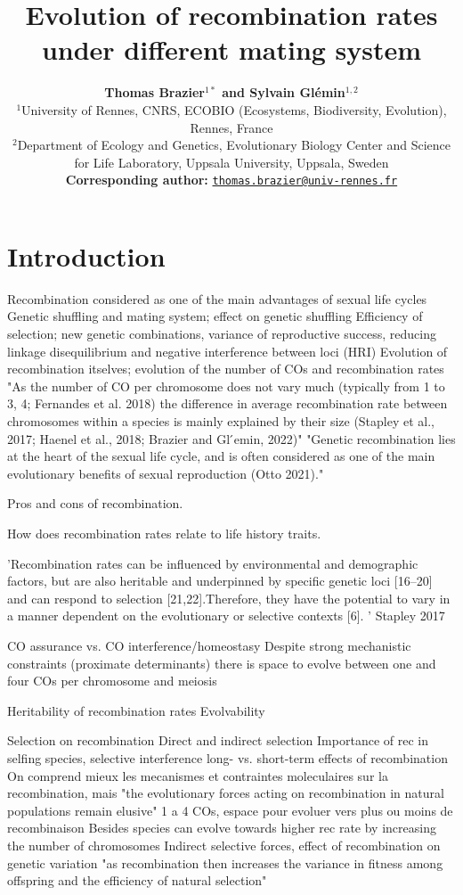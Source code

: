 \documentclass{article}
\title{Evolution of recombination rates under different mating system}
\author{
    \large
    \textbf{Thomas {Brazier}$^{1*}$\orcidlink{0000-0001-5990-7545} and Sylvain {Glémin}$^{1,2}$\orcidlink{0000-0001-7260-4573}}\\
    \normalsize
    $^{1}$University of Rennes, CNRS, ECOBIO (Ecosystems, Biodiversity, Evolution), Rennes, France\\
    $^{2}$Department of Ecology and Genetics, Evolutionary Biology Center and Science for Life Laboratory, Uppsala University, Uppsala, Sweden \\
    \textbf{Corresponding author:} \texttt{\href{mailto:thomas.brazier@univ-rennes.fr}{thomas.brazier@univ-rennes.fr}} \\
}
\begin{document}
\maketitle

\begin{abstract}
\end{abstract}


\newpage


\section*{Introduction}

Recombination considered as one of the main advantages of sexual life cycles
Genetic shuffling and mating system; effect on genetic shuffling
Efficiency of selection; new genetic combinations, variance of reproductive success, reducing linkage disequilibrium and
negative interference between loci (HRI)
Evolution of recombination itselves; evolution of the number of COs and recombination rates
"As the number of CO per chromosome does not vary much (typically from 1 to 3, 4; Fernandes et al. 2018) the difference in average recombination rate between chromosomes within a species is mainly explained by their size (Stapley et al., 2017; Haenel et al., 2018; Brazier and Gl ́emin, 2022)"
"Genetic recombination lies at the heart of the sexual life cycle, and is often considered as one of the main evolutionary benefits of sexual reproduction (Otto 2021)."

Pros and cons of recombination.

How does recombination rates relate to life history traits.

'Recombination rates can be influenced by environmental and demographic factors, but are also heritable and underpinned by specific genetic loci [16–20] and can respond to selection [21,22].Therefore, they have the potential to vary in a manner dependent on the evolutionary or selective contexts [6]. ' Stapley 2017


CO assurance vs. CO interference/homeostasy
Despite strong mechanistic constraints (proximate determinants) there is space to evolve between one and four COs per chromosome and meiosis

Heritability of recombination rates
Evolvability


Selection on recombination
Direct and indirect selection
Importance of rec in selfing species, selective interference
long- vs. short-term effects of recombination
On comprend mieux les mecanismes et contraintes moleculaires sur la recombination, mais "the evolutionary forces acting on recombination in natural populations remain elusive"
1 a 4 COs, espace pour evoluer vers plus ou moins de recombinaison
Besides species can evolve towards higher rec rate by increasing the number of chromosomes
Indirect selective forces, effect of recombination on genetic variation
"as recombination then increases the variance in fitness among offspring and the efficiency of natural selection"
\end{document}
